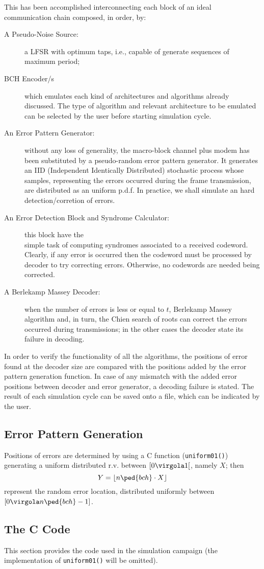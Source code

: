 This has been accomplished interconnecting each block of an ideal communication chain composed, in order, by:
\begin{description}
\item[A Pseudo-Noise Source:] a LFSR with optimum taps, i.e., capable of generate sequences of maximum period;
\item[BCH Encoder/s] which emulates each kind of architectures and algorithms already discussed. The type of algorithm and relevant architecture to be emulated can be selected by the user before starting simulation cycle.
\item[An Error Pattern Generator:] without any loss of generality, the macro-block channel plus modem has been substituted by a pseudo-random error pattern generator. It generates an IID (Independent Identically Distributed) stochastic process whose samples, representing the errors occurred during the frame transmission, are distributed as an uniform p.d.f. In practice, we shall simulate an hard detection/corretion of errors.
\item[An Error Detection Block and Syndrome Calculator:] this block have the \\
    simple task of computing syndromes associated to a received codeword. Clearly, if any error is occurred then the codeword must be processed by decoder to try correcting errors. Otherwise, no codewords are needed being corrected.
\item[A Berlekamp Massey Decoder:] when the number of errors is less or equal to \(t\), Berlekamp Massey algorithm and, in turn, the Chien search of roots can correct the errors occurred during transmissions; in the other cases the decoder state its failure in decoding.
\end{description}

In order to verify the functionality of all the algorithms, the positions of error found at the decoder size are compared with the positions added by the error pattern generation function. In case of any mismatch with the added error positions between decoder and error generator, a decoding failure is stated. The result of each simulation cycle can be saved onto a file, which can be indicated by the user.


\subsection{Error Pattern Generation}

Positions of errors are determined by using a C function (\texttt{uniform01()}) generating a uniform distributed r.v. between \([0\virgola1[\), namely \(X\); then
\[
Y = \lfloor n\ped{bch}\cdot X \rfloor
\]
represent the random error location, distributed uniformly between \([0\virgola n\ped{bch}-1]\).

\subsection{The C Code}

This section provides the code used in the simulation campaign (the implementation of \texttt{uniform01()} will be omitted).









